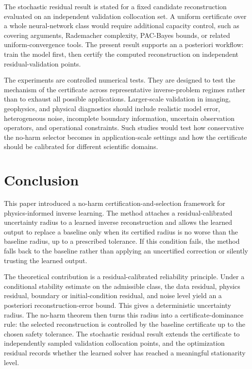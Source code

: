 \documentclass{article}
\numberwithin{equation}{section}
\theoremstyle{definition}
\begin{document}
The stochastic residual result is stated for a fixed candidate reconstruction evaluated on an independent validation collocation set. A uniform certificate over a whole neural-network class would require additional capacity control, such as covering arguments, Rademacher complexity, PAC-Bayes bounds, or related uniform-convergence tools. The present result supports an a posteriori workflow: train the model first, then certify the computed reconstruction on independent residual-validation points.

The experiments are controlled numerical tests. They are designed to test the mechanism of the certificate across representative inverse-problem regimes rather than to exhaust all possible applications. Larger-scale validation in imaging, geophysics, and physical diagnostics should include realistic model error, heterogeneous noise, incomplete boundary information, uncertain observation operators, and operational constraints. Such studies would test how conservative the no-harm selector becomes in application-scale settings and how the certificate should be calibrated for different scientific domains.

\section{Conclusion}
\label{sec:conclusion}

This paper introduced a no-harm certification-and-selection framework for physics-informed inverse learning. The method attaches a residual-calibrated uncertainty radius to a learned inverse reconstruction and allows the learned output to replace a baseline only when its certified radius is no worse than the baseline radius, up to a prescribed tolerance. If this condition fails, the method falls back to the baseline rather than applying an uncertified correction or silently trusting the learned output.

The theoretical contribution is a residual-calibrated reliability principle. Under a conditional stability estimate on the admissible class, the data residual, physics residual, boundary or initial-condition residual, and noise level yield an a posteriori reconstruction-error bound. This gives a deterministic uncertainty radius. The no-harm theorem then turns this radius into a certificate-dominance rule: the selected reconstruction is controlled by the baseline certificate up to the chosen safety tolerance. The stochastic residual result extends the certificate to independently sampled validation collocation points, and the optimization residual records whether the learned solver has reached a meaningful stationarity level.
\end{document}
